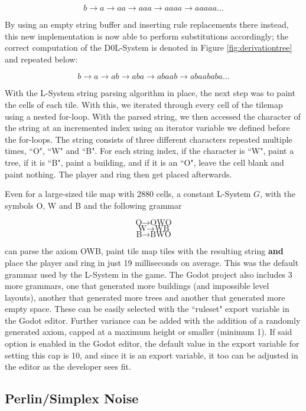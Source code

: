 $$ b \rightarrow a \rightarrow aa \rightarrow aaa \rightarrow aaaa \rightarrow aaaaa \ldots $$

By using an empty string buffer and inserting rule replacements there instead, this new implementation is now able to perform substitutions accordingly; the correct computation of the D0L-System is denoted in Figure \ref{fig:derivationtree} and repeated below:

$$ b \rightarrow a \rightarrow ab \rightarrow aba \rightarrow abaab \rightarrow abaababa \ldots $$

With the L-System string parsing algorithm in place, the next step was to paint the cells of each tile. With this, we iterated through every cell of the tilemap using a nested for-loop. With the parsed string, we then accessed the character of the string at an incremented index using an iterator variable we defined before the for-loops. The string consists of three different characters repeated multiple times, ``O", ``W" and ``B". For each string index, if the character is ``W", paint a tree, if it is ``B", paint a building, and if it is an ``O", leave the cell blank and paint nothing. The player and ring then get placed afterwards.

Even for a large-sized tile map with 2880 cells, a constant L-System $G$, with the symbols O, W and B and the following grammar

$$ \mbox{O} \rightarrow \mbox{O}\mbox{W}\mbox{O} $$
$$ \mbox{W} \rightarrow \mbox{W}\mbox{B} $$
$$ \mbox{B} \rightarrow \mbox{B}\mbox{W}\mbox{O} $$

can parse the axiom OWB, paint tile map tiles with the resulting string \textbf{and} place the player and ring in just 19 milliseconds on average. This was the default grammar used by the L-System in the game. The Godot project also includes 3 more grammars, one that generated more buildings (and impossible level layouts), another that generated more trees and another that generated more empty space. These can be easily selected with the ``ruleset" export variable in the Godot editor. Further variance can be added with the addition of a randomly generated axiom, capped at a maximum height or smaller (minimum 1). If said option is enabled in the Godot editor, the default value in the export variable for setting this cap is 10, and since it is an export variable, it too can be adjusted in the editor as the developer sees fit.

\subsection{Perlin/Simplex Noise} \label{impperlin1}

